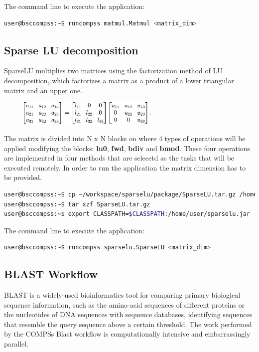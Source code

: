 The command line to execute the application:

\begin{lstlisting}[language=bash]
user@bsccompss:~$ runcompss matmul.Matmul <matrix_dim>
\end{lstlisting}


\subsection{Sparse LU decomposition}
SparseLU multiplies two matrices using the factorization method of LU decomposition, which factorizes a 
matrix as a product of a lower triangular matrix and an upper one.

\begin{figure}[ht!]
  \centering
    \includegraphics[width=0.6\textwidth]{./Sections/4_Sample_Apps/Figures/SparseLU.jpeg}
\end{figure}

The matrix is divided into N x N blocks on where 4 types of operations will be applied modifying the blocks: 
{\bf lu0}, {\bf fwd}, {\bf bdiv} and {\bf bmod}. These four operations are implemented in four methods that 
are selecetd as the tasks that will be executed remotely. In order to run the application the matrix dimension 
has to be provided.

\begin{lstlisting}[language=bash]
user@bsccompss:~$ cp ~/workspace/sparselu/package/SparseLU.tar.gz /home/user/
user@bsccompss:~$ tar xzf SparseLU.tar.gz
user@bsccompss:~$ export CLASSPATH=$CLASSPATH:/home/user/sparselu.jar
\end{lstlisting}

The command line to execute the application:

\begin{lstlisting}[language=bash]
user@bsccompss:~$ runcompss sparselu.SparseLU <matrix_dim>
\end{lstlisting}

\subsection{BLAST Workflow}
BLAST is a widely-used bioinformatics tool for comparing primary biological sequence information, such as 
the amino-acid sequences of different proteins or the nucleotides of DNA sequences with sequence databases, 
identifying sequences that resemble the query sequence above a certain threshold. 
The work performed by the COMPSs Blast workflow is computationally intensive and embarrassingly parallel.

